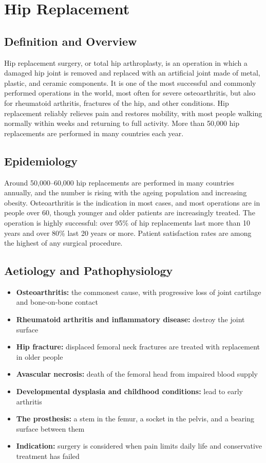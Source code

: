 \chapter{Hip Replacement}

\section*{Definition and Overview}
Hip replacement surgery, or total hip arthroplasty, is an operation in which a damaged hip joint is removed and replaced with an artificial joint made of metal, plastic, and ceramic components. It is one of the most successful and commonly performed operations in the world, most often for severe osteoarthritis, but also for rheumatoid arthritis, fractures of the hip, and other conditions. Hip replacement reliably relieves pain and restores mobility, with most people walking normally within weeks and returning to full activity. More than 50,000 hip replacements are performed in many countries each year.

\section*{Epidemiology}
Around 50,000--60,000 hip replacements are performed in many countries annually, and the number is rising with the ageing population and increasing obesity. Osteoarthritis is the indication in most cases, and most operations are in people over 60, though younger and older patients are increasingly treated. The operation is highly successful: over 95\% of hip replacements last more than 10 years and over 80\% last 20 years or more. Patient satisfaction rates are among the highest of any surgical procedure.

\section*{Aetiology and Pathophysiology}
\begin{itemize}
    \item \textbf{Osteoarthritis:} the commonest cause, with progressive loss of joint cartilage and bone-on-bone contact
    \item \textbf{Rheumatoid arthritis and inflammatory disease:} destroy the joint surface
    \item \textbf{Hip fracture:} displaced femoral neck fractures are treated with replacement in older people
    \item \textbf{Avascular necrosis:} death of the femoral head from impaired blood supply
    \item \textbf{Developmental dysplasia and childhood conditions:} lead to early arthritis
    \item \textbf{The prosthesis:} a stem in the femur, a socket in the pelvis, and a bearing surface between them
    \item \textbf{Indication:} surgery is considered when pain limits daily life and conservative treatment has failed
\end{itemize}

